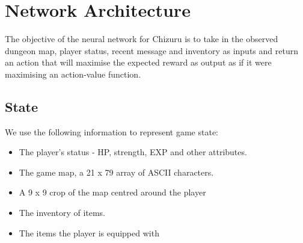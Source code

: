 \documentclass[11pt,a4paper]{article}
\begin{document}





    \section{Network Architecture}
    The objective of the neural network for Chizuru is to take in the observed dungeon map, player status, recent message and inventory as inputs and return an action that will maximise the expected reward as output as if it were maximising an action-value function.

    \subsection{State}
    We use the following information to represent game state:
    \begin{itemize}
        \item The player's status - HP, strength, EXP and other attributes.
        \item The game map, a 21 x 79 array of ASCII characters.
        \item A 9 x 9 crop of the map centred around the player
        \item The inventory of items.
        \item The items the player is equipped with
    \end{itemize}
\end{document}

